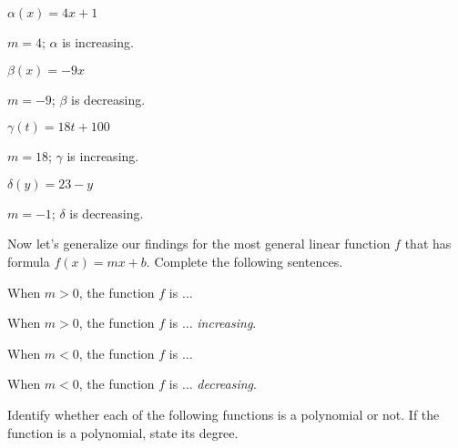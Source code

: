 \begin{exercises}
\begin{problem}
 	\begin{multicols}{4}
 		\begin{subproblem}
 			$\alpha(x)=4x+1$
 			\begin{shortsolution}
 				$m=4$; $\alpha$ is increasing.
 			\end{shortsolution}
 		\end{subproblem}
 		\begin{subproblem}
 			$\beta(x)=-9x$
 			\begin{shortsolution}
 				$m=-9$; $\beta$ is decreasing.
 			\end{shortsolution}
 		\end{subproblem}
 		\begin{subproblem}
 			$\gamma(t)=18t+100$
 			\begin{shortsolution}
 				$m=18$; $\gamma$ is increasing.
 			\end{shortsolution}
 		\end{subproblem}
 		\begin{subproblem}
 			$\delta(y)=23-y$
 			\begin{shortsolution}
 				$m=-1$; $\delta$ is decreasing.
 			\end{shortsolution}
 		\end{subproblem}
 	\end{multicols}
 	Now let's generalize our findings for the most general linear function $f$
 	that has formula $f(x)=mx+b$. Complete the following sentences.
 	\begin{subproblem}
 		When $m>0$, the function $f$ is $\ldots$
 		\begin{shortsolution}
 			When $m>0$, the function $f$ is $\ldots$  \emph{increasing}.
 		\end{shortsolution}
 	\end{subproblem}
 	\begin{subproblem}
 		When $m<0$, the function $f$ is $\ldots$
 		\begin{shortsolution}
 			When $m<0$, the function $f$ is $\ldots$  \emph{decreasing}.
 		\end{shortsolution}
 	\end{subproblem}
 	\end{problem}
 	\begin{problem}
 	Identify whether each of the following functions is a polynomial or not.
 	If the function is a polynomial, state its degree.

\end{problem}
\end{exercises}
